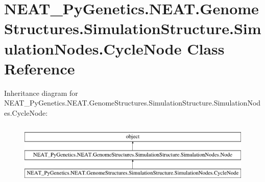\hypertarget{class_n_e_a_t___py_genetics_1_1_n_e_a_t_1_1_genome_structures_1_1_simulation_structure_1_1_simulation_nodes_1_1_cycle_node}{}\section{N\+E\+A\+T\+\_\+\+Py\+Genetics.\+N\+E\+A\+T.\+Genome\+Structures.\+Simulation\+Structure.\+Simulation\+Nodes.\+Cycle\+Node Class Reference}
\label{class_n_e_a_t___py_genetics_1_1_n_e_a_t_1_1_genome_structures_1_1_simulation_structure_1_1_simulation_nodes_1_1_cycle_node}
Inheritance diagram for N\+E\+A\+T\+\_\+\+Py\+Genetics.\+N\+E\+A\+T.\+Genome\+Structures.\+Simulation\+Structure.\+Simulation\+Nodes.\+Cycle\+Node\+:\begin{figure}[H]
\begin{center}
\leavevmode
\includegraphics[height=3.000000cm]{class_n_e_a_t___py_genetics_1_1_n_e_a_t_1_1_genome_structures_1_1_simulation_structure_1_1_simulation_nodes_1_1_cycle_node}
\end{center}
\end{figure}
